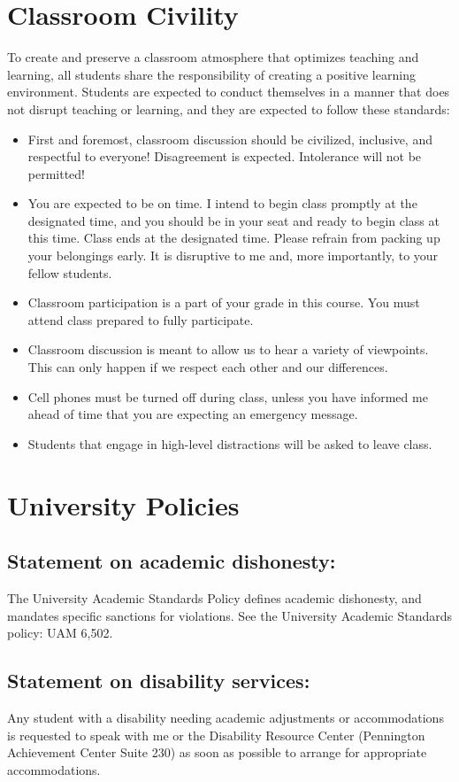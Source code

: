 \documentclass[11pt, a4paper]{article}
\begin{document}
\section*{Classroom Civility}
To create and preserve a classroom atmosphere that optimizes teaching and learning, all students share the responsibility of creating a positive learning environment. Students are expected to conduct themselves in a manner that does not disrupt teaching or learning, and they are expected to follow these standards:
\begin{itemize}
\item First and foremost, classroom discussion should be civilized, inclusive, and respectful to everyone! Disagreement is expected. Intolerance will not be permitted!
\item You are expected to be on time. I intend to begin class promptly at the designated time, and you should be in your seat and ready to begin class at this time. Class ends at the designated time. Please refrain from packing up your belongings early. It is disruptive to me and, more importantly, to your fellow students.
\item Classroom participation is a part of your grade in this course. You must attend class prepared to fully participate. 
\item Classroom discussion is meant to allow us to hear a variety of viewpoints. This can only happen if we respect each other and our differences.
\item Cell phones must be turned off during class, unless you have informed me ahead of time that you are expecting an emergency message.
\item Students that engage in high-level distractions will be asked to leave class. 
\end{itemize}


\section*{University Policies}

\subsection*{Statement on academic dishonesty:}
The University Academic Standards Policy defines academic dishonesty,
and mandates specific sanctions for violations. See the University
Academic Standards policy: UAM 6,502.

\subsection*{Statement on disability services:}
Any student with a disability needing academic adjustments or
accommodations is requested to speak with me or the Disability
Resource Center (Pennington Achievement Center Suite 230) as soon as
possible to arrange for appropriate accommodations.
\end{document}

